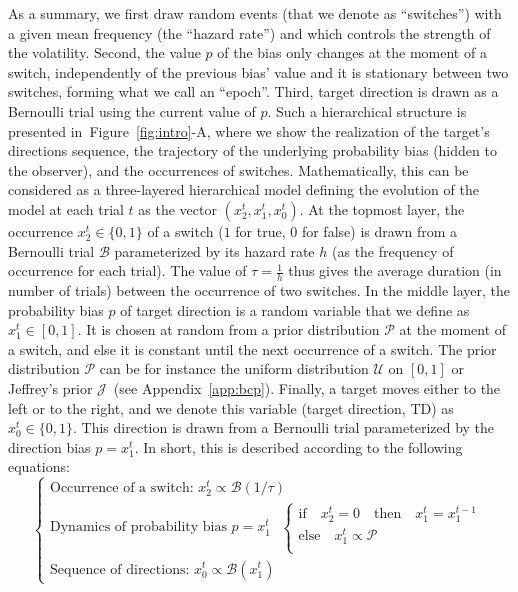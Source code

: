 \documentclass[10pt,letterpaper]{article}
\newcommand{\choice}[1]{ %
	\left\{ %
		\begin{array}{l} #1 \end{array} %
	\right. }
\newcommand{\eql}[1]{\begin{equation}#1\end{equation}}
\newcommand{\Bb}{\mathcal{B}}
\newcommand{\Jj}{\mathcal{J}}
\newcommand{\Pp}{\mathcal{P}}
\newcommand{\Uu}{\mathcal{U}}
\newcommand{\seeFig}[1]{Figure~\ref{fig:#1}}
\newcommand{\seeApp}[1]{Appendix~\ref{app:#1}}
\begin{document}
As a summary, we first draw random events (that we denote as ``switches'')
with a given mean frequency (the ``hazard rate'') and which controls the strength of the volatility.
Second, the value $p$ of the bias only changes at the moment of a switch,
independently of the previous bias' value
and it is stationary between two switches, forming what we call an ``epoch''.
Third, target direction is drawn as a Bernoulli trial using the current value of $p$.
Such a hierarchical structure is presented in~\seeFig{intro}-A,
where we show the realization of the target's directions sequence,
the trajectory of the underlying probability bias (hidden to the observer), and
the occurrences of switches.
Mathematically, this can be considered as a three-layered hierarchical model
defining the evolution of the model at each trial $t$ as the vector  $(x_2^t, x_1^t, x_0^t)$.
At the topmost layer,
the occurrence $x_2^t \in \{ 0, 1 \}$ of a switch ($1$ for true, $0$ for false)
is  drawn from a Bernoulli trial $\Bb$ parameterized by its hazard rate $h$
(as the frequency of occurrence for each trial).
The value of $\tau=\frac 1 h$ thus gives the average duration (in number of trials)
between the occurrence of two switches.
In the middle layer, the probability bias $p$ of target direction
is a random variable that we define as $x_1^t \in [0, 1]$.
It is chosen at random from a prior distribution $\Pp$
at the moment of a switch,
and else it is constant until the next occurrence of a switch.
The prior distribution $\Pp$ can be for instance
the uniform distribution $\Uu$ on $ [ 0, 1 ] $ or
Jeffrey's prior $\Jj$~(see \seeApp{bcp}).
Finally, a target moves either to the left or to the right,
and we denote this variable (target direction, TD) as $x_0^t \in \{ 0, 1 \}$.
This direction is drawn from a Bernoulli trial
parameterized by the direction bias $p=x_1^t$.
In short, this is described according to the following equations:
 \eql{\choice{
\text{Occurrence of a switch: } x_2^t \propto \Bb(1/\tau) \\
\text{Dynamics of probability bias $p=x_1^t$ }
 \choice{\text{if} \quad x_2^t=0 \quad \text{then} \quad  x_1^t = x_1^{t-1} \\
 \text{else} \quad x_1^t \propto \Pp  \\
 } \\
\text{Sequence of directions: } x_0^t \propto \Bb(x_1^t)
 }\label{eq:bsm}}
\end{document}
